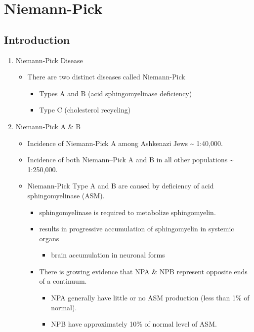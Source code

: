 \documentclass{scrartcl}
\begin{document}
\section{Niemann-Pick}
\label{sec:org0d1a47b}
\subsection{Introduction}
\label{sec:org854d454}

\begin{enumerate}
\item Niemann-Pick Disease
\label{sec:org189b9e4}
\begin{itemize}
\item There are two distinct diseases called Niemann-Pick
\begin{itemize}
\item Types A and B (acid sphingomyelinase deficiency)
\item Type C (cholesterol recycling)
\end{itemize}
\end{itemize}

\item Niemann-Pick A \& B
\label{sec:org4a7f0ac}
\begin{itemize}
\item Incidence of Niemann-Pick A among Ashkenazi Jews \textasciitilde{} 1:40,000.
\item Incidence of both Niemann–Pick A and B in all other populations \textasciitilde{} 1:250,000.
\item Niemann-Pick Type A and B are caused by deficiency of acid sphingomyelinase (ASM).
\begin{itemize}
\item sphingomyelinase is required to metabolize sphingomyelin.
\item results in progressive accumulation of sphingomyelin in systemic organs
\begin{itemize}
\item brain accumulation in neuronal forms
\end{itemize}
\item There is growing evidence that NPA \& NPB represent opposite ends of a continuum.
\begin{itemize}
\item NPA generally have little or no ASM production (less than 1\% of normal).
\item NPB have approximately 10\% of normal level of ASM.
\end{itemize}
\end{itemize}
\end{itemize}


\end{enumerate}
\end{document}

